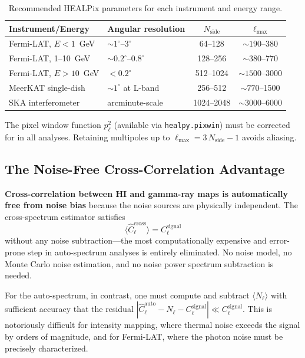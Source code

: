 \documentclass[10pt,a4paper]{article}
\newcommand{\Cl}{C_\ell}
\begin{document}
\begin{table}[h]
\centering
\begin{tabular}{@{}llcc@{}}
\toprule
Instrument/Energy & Angular resolution & $N_{\mathrm{side}}$ & $\ell_{\max}$ \\
\midrule
Fermi-LAT, $E < 1$~GeV & $\sim 1^\circ$--$3^\circ$ & 64--128 & $\sim 190$--380 \\
Fermi-LAT, 1--10~GeV & $\sim 0.2^\circ$--$0.8^\circ$ & 128--256 & $\sim 380$--770 \\
Fermi-LAT, $E > 10$~GeV & $< 0.2^\circ$ & 512--1024 & $\sim 1500$--3000 \\
MeerKAT single-dish & $\sim 1^\circ$ at L-band & 256--512 & $\sim 770$--1500 \\
SKA interferometer & arcminute-scale & 1024--2048 & $\sim 3000$--6000 \\
\bottomrule
\end{tabular}
\caption{Recommended HEALPix parameters for each instrument and energy range.}
\label{tab:healpix}
\end{table}

The pixel window function $p_\ell^2$ (available via \texttt{healpy.pixwin}) must be corrected for in all analyses. Retaining multipoles up to $\ell_{\max} = 3\,N_{\mathrm{side}} - 1$ avoids aliasing.


\subsection{The Noise-Free Cross-Correlation Advantage}

\textbf{Cross-correlation between HI and gamma-ray maps is automatically free from noise bias} because the noise sources are physically independent. The cross-spectrum estimator satisfies
\begin{equation}
\langle \hat{C}_\ell^{\mathrm{cross}}\rangle = \Cl^{\mathrm{signal}}
\end{equation}
without any noise subtraction---the most computationally expensive and error-prone step in auto-spectrum analyses is entirely eliminated. No noise model, no Monte Carlo noise estimation, and no noise power spectrum subtraction is needed.

For the auto-spectrum, in contrast, one must compute and subtract $\langle N_\ell \rangle$ with sufficient accuracy that the residual $|\hat{C}_\ell^{\mathrm{auto}} - N_\ell - \Cl^{\mathrm{signal}}| \ll \Cl^{\mathrm{signal}}$. This is notoriously difficult for intensity mapping, where thermal noise exceeds the signal by orders of magnitude, and for Fermi-LAT, where the photon noise must be precisely characterized.
\end{document}
